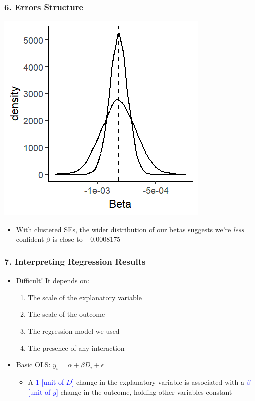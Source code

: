 \documentclass[xcolor=x11names,compress]{beamer}\usepackage[]{graphicx}\usepackage[]{color}
\makeatletter
\def\maxwidth{ %
  \ifdim\Gin@nat@width>\linewidth
    \linewidth
  \else
    \Gin@nat@width
  \fi
}
\newenvironment{knitrout}{}{} %
\renewcommand{\(}{\begin{columns}}
\renewcommand{\)}{\end{columns}}
\newcommand{\<}[1]{\begin{column}{#1}}
\renewcommand{\>}{\end{column}}
\makeatother
\begin{document}
\begin{frame}
\frametitle{6. Errors Structure}
\begin{multicols}{2}
\begin{knitrout}
\color{fgcolor}
\includegraphics[width=\maxwidth]{figure/beta_dist_errors_5-1} 

\end{knitrout}
\columnbreak
\begin{itemize}
\item With clustered SEs, the wider distribution of our betas suggests we're \textit{less} confident $\beta$ is close to $-0.0008175$
\end{itemize}
\end{multicols}
\end{frame}

\begin{frame}
\frametitle{7. Interpreting Regression Results}
\begin{itemize}
\item Difficult! It depends on:
\begin{enumerate}
\item The scale of the explanatory variable
\pause
\item The scale of the outcome
\pause
\item The regression model we used
\pause
\item The presence of any interaction
\pause
\end{enumerate}
\item Basic OLS: $y_i = \alpha + \beta D_i + \epsilon$
\pause
\begin{itemize}
\item A \textcolor{blue}{1 [unit of $D$]} change in the explanatory variable is associated with a \textcolor{blue}{$\beta$ [unit of $y$]} change in the outcome, holding other variables constant
\end{itemize}
\end{itemize}
\end{frame}
\end{document}
